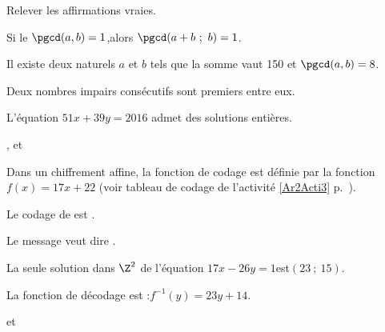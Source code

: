 \begin{QCM}
\begin{GroupeQCM}
\begin{exercice}
Relever les affirmations vraies.
\begin{ChoixQCM}{1}
\item Si le $\pgcd(a,b)=1$,\enskip alors $\pgcd(a+b\ ;\ b)=1$.
\item Il existe deux naturels $a$ et $b$ tels que la somme vaut 150
  et $\pgcd(a,b)=8$.
\item Deux nombres impairs consécutifs sont premiers entre eux.
\item L'équation $51x+39y=2016$ admet des solutions entières.
\end{ChoixQCM}
\end{exercice}
\begin{corrige}
,  et 
\end{corrige}

\begin{exercice}
  Dans un chiffrement affine, la fonction de codage est définie par la
  fonction $f(x)=17x+22$ (voir tableau de codage de l'activité
  \ref{Ar2Acti3} p.~\pageref{Ar2Acti3}).
\begin{ChoixQCM}{1}
\item Le codage de  est .
\item Le message  veut dire .
\item La seule solution dans $\Z^2$ de l'équation\enskip
  $17x-26y=1$\enskip est\enskip $(23\ ;\ 15)$.
\item La fonction de décodage est :\enskip $f^{-1}(y)=23y+14$.
\end{ChoixQCM}
\end{exercice}
\begin{corrige}
 et 
\end{corrige}
\end{GroupeQCM}
\end{QCM}



